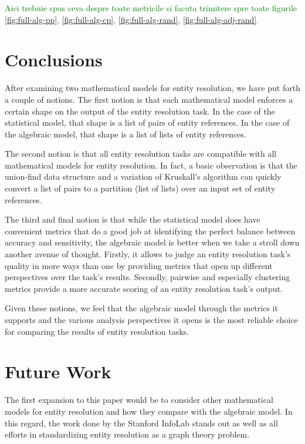 \documentclass[11pt]{article}
\begin{document}
    \textcolor{green}{Aici trebuie spus ceva despre toate metricile si facuta trimitere spre toate figurile \ref{fig:full-alg-pp}, \ref{fig:full-alg-cp}, \ref{fig:full-alg-rand}, \ref{fig:full-alg-adj-rand}.}


    \section[conclusion]{Conclusions}
    \label{section:conclusions}

    After examining two mathematical models for entity resolution, we have put
    forth a couple of notions.
    The first notion is that each mathematical model enforces a certain shape
    on the output of the entity resolution task.
    In the case of the statistical model, that shape is a list of pairs of
    entity references.
    In the case of the algebraic model, that shape is a list of lists of entity
    references.

    The second notion is that all entity resolution tasks are compatible with
    all mathematical models for entity resolution.
    In fact, a basic observation is that the union-find data structure and a
    variation of Kruskall's algorithm can quickly convert a list of pairs to a
    partition (list of lists) over an input set of entity references.
    
    The third and final notion is that while the statistical model does have
    convenient metrics that do a good job at identifying the perfect balance
    between accuracy and sensitivity, the algebraic model is better when we take
    a stroll down another avenue of thought.
    Firstly, it allows to judge an entity resolution task's quality in more ways
    than one by providing metrics that open up different perspectives over the
    task's results.
    Secondly, pairwise and especially clustering metrics provide a more accurate
    scoring of an entity resolution task's output.
    
    Given these notions, we feel that the algebraic model through the metrics it
    supports and the various analysis perspectives it opens is the most reliable
    choice for comparing the results of entity resolution tasks.

    \section[future]{Future Work}\label{section:future}

    The first expansion to this paper would be to consider other mathematical
    models for entity resolution and how they compare with the algebraic model.
    In this regard, the work done by the Stanford InfoLab stands out as well as
    all efforts in standardizing entity resolution as a graph theory problem.
\end{document}
